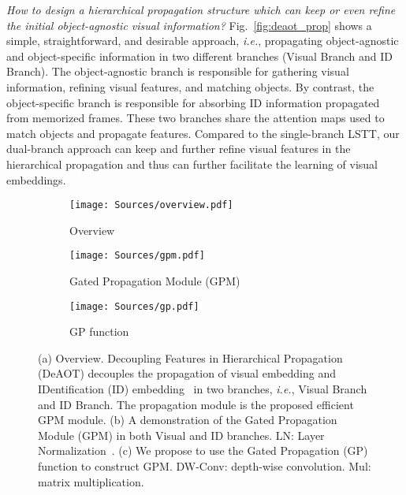 \documentclass{article}
\def\ie{\emph{i.e.}}
\begin{document}
\textit{How to design a hierarchical propagation structure which can keep or even refine the initial object-agnostic visual information?} Fig.~\ref{fig:deaot_prop} shows a simple, straightforward, and desirable approach, \ie, propagating object-agnostic and object-specific information in two different branches (Visual Branch and ID Branch). The object-agnostic branch is responsible for gathering visual information, refining visual features, and matching objects. By contrast, the object-specific branch is responsible for absorbing ID information propagated from memorized frames. These two branches share the attention maps used to match objects and propagate features. Compared to the single-branch LSTT, our dual-branch approach can keep and further refine visual features in the hierarchical propagation and thus can further facilitate the learning of visual embeddings. 
\begin{figure}[t!]
\begin{center}

\begin{subfigure}[b]{.33\textwidth}
			\centering
			\texttt{[image: Sources/overview.pdf]}
			\caption{Overview}\label{fig:overview}
\end{subfigure}
\begin{subfigure}[b]{.46\textwidth}
			\centering
			\texttt{[image: Sources/gpm.pdf]}

			\caption{Gated Propagation Module (GPM)}\label{fig:gpm}
\end{subfigure}
\begin{subfigure}[b]{.19\textwidth}
			\centering
			\texttt{[image: Sources/gp.pdf]}

			\caption{GP function}\label{fig:gp}
\end{subfigure}

\end{center}

\caption{(a) Overview. Decoupling Features in Hierarchical Propagation (DeAOT) decouples the propagation of visual embedding and IDentification (ID) embedding~\cite{aot} in two branches, \ie, Visual Branch and ID Branch. The propagation module is the proposed efficient GPM module. (b) A demonstration of the Gated Propagation Module (GPM) in both Visual and ID branches. LN: Layer Normalization~\cite{ln}. (c) We propose to use the Gated Propagation (GP) function to construct GPM. DW-Conv: depth-wise convolution. Mul: matrix multiplication.}
\end{figure} 
\end{document}
